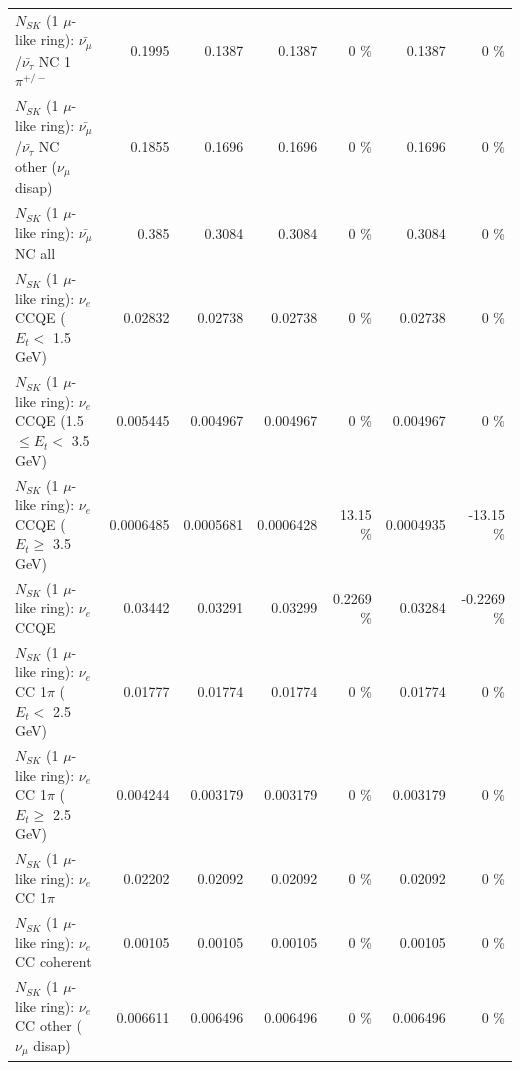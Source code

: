 \begin{table}
\begin{tabular}{| l | r | r | r  r | r  r |}
\hline
  $N_{SK}$ (1 $\mu$-like ring): $\bar{\nu_\mu}$/$\bar{\nu_\tau}$ NC 1$\pi^{+/-}$ &          0.1995 &          0.1387 &          0.1387 &        0 \%  &          0.1387 &        0 \%  \\ 
$N_{SK}$ (1 $\mu$-like ring): $\bar{\nu_\mu}$/$\bar{\nu_\tau}$ NC other ($\nu_\mu$ disap) &          0.1855 &          0.1696 &          0.1696 &        0 \%  &          0.1696 &        0 \%  \\ 
                          $N_{SK}$ (1 $\mu$-like ring): $\bar{\nu_{\mu}}$ NC all &           0.385 &          0.3084 &          0.3084 &        0 \%  &          0.3084 &        0 \%  \\ 
\hline
\hline
\hline
                  $N_{SK}$ (1 $\mu$-like ring): $\nu_e$ CCQE ($E_{t} <$ 1.5 GeV) &         0.02832 &         0.02738 &         0.02738 &        0 \%  &         0.02738 &        0 \%  \\ 
         $N_{SK}$ (1 $\mu$-like ring): $\nu_e$ CCQE (1.5 $\leq E_{t} <$ 3.5 GeV) &        0.005445 &        0.004967 &        0.004967 &        0 \%  &        0.004967 &        0 \%  \\ 
               $N_{SK}$ (1 $\mu$-like ring): $\nu_e$ CCQE ($E_{t} \geq$ 3.5 GeV) &       0.0006485 &       0.0005681 &       0.0006428 &    13.15 \%  &       0.0004935 &   -13.15 \%  \\ 
\hline
                                      $N_{SK}$ (1 $\mu$-like ring): $\nu_e$ CCQE &         0.03442 &         0.03291 &         0.03299 &   0.2269 \%  &         0.03284 &  -0.2269 \%  \\ 
\hline
             $N_{SK}$ (1 $\mu$-like ring): $\nu_e$ CC 1$\pi$ ($E_{t} <$ 2.5 GeV) &         0.01777 &         0.01774 &         0.01774 &        0 \%  &         0.01774 &        0 \%  \\ 
          $N_{SK}$ (1 $\mu$-like ring): $\nu_e$ CC 1$\pi$ ($E_{t} \geq$ 2.5 GeV) &        0.004244 &        0.003179 &        0.003179 &        0 \%  &        0.003179 &        0 \%  \\ 
\hline
                                 $N_{SK}$ (1 $\mu$-like ring): $\nu_e$ CC 1$\pi$ &         0.02202 &         0.02092 &         0.02092 &        0 \%  &         0.02092 &        0 \%  \\ 
                               $N_{SK}$ (1 $\mu$-like ring): $\nu_e$ CC coherent &         0.00105 &         0.00105 &         0.00105 &        0 \%  &         0.00105 &        0 \%  \\ 
                $N_{SK}$ (1 $\mu$-like ring): $\nu_e$ CC other ($\nu_\mu$ disap) &        0.006611 &        0.006496 &        0.006496 &        0 \%  &        0.006496 &        0 \%  \\ 

\end{tabular}
\end{table}
